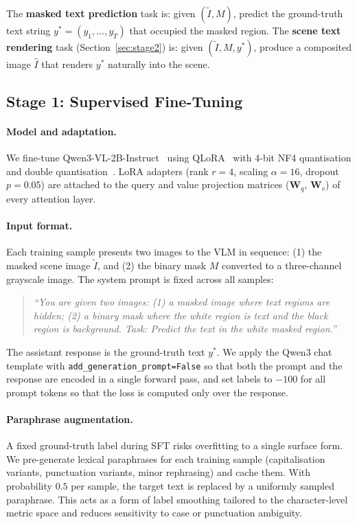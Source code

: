 \documentclass[uplatex,10pt,twocolumn,a4paper]{article}
\begin{document}
The \textbf{masked text prediction} task is: given $(\tilde{I}, M)$,
predict the ground-truth text string $y^* = (y_1,\ldots,y_T)$ that
occupied the masked region.
The \textbf{scene text rendering} task (Section~\ref{sec:stage2}) is:
given $(\tilde{I}, M, y^*)$, produce a composited image $\hat{I}$ that
renders $y^*$ naturally into the scene.

\subsection{Stage 1: Supervised Fine-Tuning}
\label{sec:sft}

\paragraph{Model and adaptation.}
We fine-tune Qwen3-VL-2B-Instruct~\cite{qwen3vl2025} using
QLoRA~\cite{qlora2023} with 4-bit NF4 quantisation and double
quantisation~\cite{qlora2023}.
LoRA adapters (rank $r=4$, scaling $\alpha=16$, dropout $p=0.05$) are
attached to the query and value projection matrices ($\mathbf{W}_q$,
$\mathbf{W}_v$) of every attention layer.

\paragraph{Input format.}
Each training sample presents two images to the VLM in sequence:
(1) the masked scene image $\tilde{I}$, and
(2) the binary mask $M$ converted to a three-channel grayscale image.
The system prompt is fixed across all samples:
\begin{quote}
  \small
  \textit{``You are given two images: (1) a masked image where text
  regions are hidden; (2) a binary mask where the white region is text
  and the black region is background.
  Task: Predict the text in the white masked region.''}
\end{quote}
The assistant response is the ground-truth text $y^*$.
We apply the Qwen3 chat template with \texttt{add\_generation\_prompt=False}
so that both the prompt and the response are encoded in a single forward
pass, and set labels to $-100$ for all prompt tokens so that the loss
is computed only over the response.

\paragraph{Paraphrase augmentation.}
A fixed ground-truth label during SFT risks overfitting to a single
surface form.
We pre-generate lexical paraphrases for each training sample
(capitalisation variants, punctuation variants, minor rephrasing) and
cache them.
With probability $0.5$ per sample, the target text is replaced by a
uniformly sampled paraphrase.
This acts as a form of label smoothing tailored to the character-level
metric space and reduces sensitivity to case or punctuation ambiguity.
\end{document}
